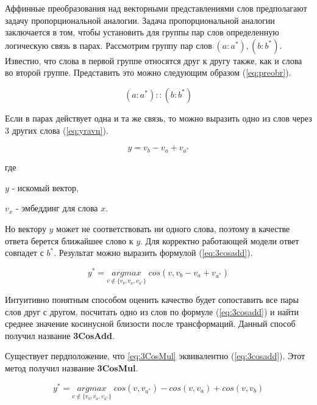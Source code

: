 \documentclass[a4paper,14pt]{article}
\begin{document}
	Аффинные преобразования над векторными представлениями слов предполагают задачу пропорциональной аналогии.
	Задача пропорциональной аналогии заключается в том, чтобы установить для группы пар слов определенную логическую связь в парах.
	Рассмотрим группу пар слов $(a: a^*), (b: b^*)$. 
	Известно, что слова в первой группе относятся друг к другу также, как и слова во второй группе.
	Представить это можно следующим образом (\ref{eq:preobr}).
	
	\begin{equation}
		(a: a^*) :: (b: b^*)
		\label{eq:preobr}
	\end{equation}

	Если в парах действует одна и та же связь, то можно выразить одно из слов через 3 других слова (\ref{eq:yravn}).
	
	\begin{equation}
		y = v_b - v_a + v_{a^*}
		\label{eq:yravn}
	\end{equation}
	 
	 где 
	 
	 $y$ - искомый вектор,
	 
	 $v_x$ - эмбеддинг для слова $x$.
	 
	 Но вектору $y$ может не соответствовать ни одного слова, поэтому в качестве ответа берется ближайшее слово к $y$.
	 Для корректно работающей модели ответ совпадет с $b^*$.
	 Результат можно выразить формулой (\ref{eq:3cosadd}).
	 
	 \begin{equation}
	 	y^* = \underset{v \notin \{v_b, v_a, v_{a^*}\}}{argmax} \; cos(v, v_b - v_a + v_{a^*})
	 	\label{eq:3cosadd}
	 \end{equation}
	 
	 
	Интуитивно понятным способом оценить качество будет сопоставить все пары слов друг с другом, посчитать одно из слов по формуле (\ref{eq:3cosadd}) и найти среднее значение косинусной близости после трансформаций.
	Данный способ получил название \textbf{3CosAdd}.
	
	Существует пердположение, что \ref{eq:3CosMul} эквивалентно (\ref{eq:3cosadd}). Этот метод получил название \textbf{3CosMul}.
	
	\begin{equation}
		y^* = \underset{v \notin \{v_b, v_a, v_{a^*}\}}{argmax} \; cos(v, v_{a^*}) - cos(v, v_a) + cos(v, v_b)
		\label{eq:3CosMul}
	\end{equation}
\end{document}
